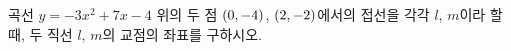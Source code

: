곡선 $y=-3x^2+7x-4$ 위의 두 점 $(0{,}\mkern3mu\mathopen{}-4)$, $(2{,}\mkern3mu\mathopen{}-2)$에서의 접선을 각각 $l$, $m$이라 할 때, 두 직선 $l$, $m$의 교점의 좌표를 구하시오.

